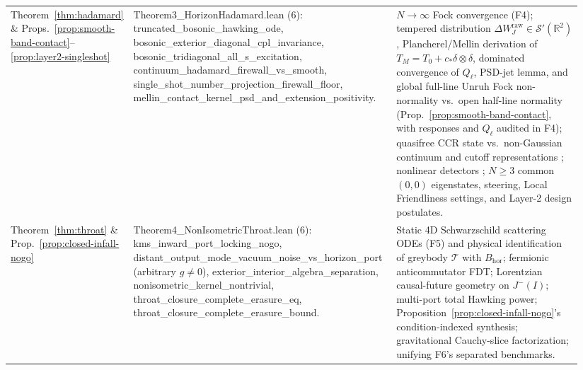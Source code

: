 \documentclass[11pt,a4paper]{article}
\theoremstyle{definition}
\theoremstyle{remark}
\newcommand{\cT}{\mathcal{T}}
\newcommand{\bbR}{\mathbb{R}}
\newcommand{\1}{\mathbf{1}}
\newcommand{\code}[1]{{\scriptsize\ttfamily #1}}
\begin{document}
\begin{table}[!tb]
\begin{tabular}{@{}>{\raggedright\arraybackslash}p{0.15\linewidth}>{\raggedright\arraybackslash}p{0.46\linewidth}>{\raggedright\arraybackslash}p{0.33\linewidth}@{}}
Theorem~\ref{thm:hadamard} \& Props.~\ref{prop:smooth-band-contact}--\ref{prop:layer2-singleshot} & \code{Theorem3\_\allowbreak HorizonHadamard.lean} (6): \code{truncated\_\allowbreak bosonic\_\allowbreak hawking\_\allowbreak ode}, \code{bosonic\_\allowbreak exterior\_\allowbreak diagonal\_\allowbreak cpl\_\allowbreak invariance}, \code{bosonic\_\allowbreak tridiagonal\_\allowbreak all\_\allowbreak s\_\allowbreak excitation}, \code{continuum\_\allowbreak hadamard\_\allowbreak firewall\_\allowbreak vs\_\allowbreak smooth}, \code{single\_\allowbreak shot\_\allowbreak number\_\allowbreak projection\_\allowbreak firewall\_\allowbreak floor}, \code{mellin\_\allowbreak contact\_\allowbreak kernel\_\allowbreak psd\_\allowbreak and\_\allowbreak extension\_\allowbreak positivity}. & $N\to\infty$ Fock convergence (F4); tempered distribution $\Delta W_J^{\mathrm{raw}}\in\mathcal{S}'(\bbR^2)$, Plancherel/Mellin derivation of $T_M=T_0+c_*\delta\otimes\delta$, dominated convergence of $Q_\ell$, PSD-jet lemma, and global full-line Unruh Fock non-normality vs.\ open half-line normality (Prop.~\ref{prop:smooth-band-contact}, with responses and $Q_\ell$ audited in F4); quasifree CCR state vs.\ non-Gaussian continuum and cutoff representations \cite{ArakiShiraishi1971}; nonlinear detectors \cite{Zambianco2026}; $N\ge 3$ common $(0,0)$ eigenstates, steering, Local Friendliness settings, and Layer-2 design postulates. \\
Theorem~\ref{thm:throat} \& Prop.~\ref{prop:closed-infall-nogo} & \code{Theorem4\_\allowbreak NonIsometricThroat.lean} (6): \code{kms\_\allowbreak inward\_\allowbreak port\_\allowbreak locking\_\allowbreak nogo}, \code{distant\_\allowbreak output\_\allowbreak mode\_\allowbreak vacuum\_\allowbreak noise\_\allowbreak vs\_\allowbreak horizon\_\allowbreak port} (arbitrary $g\neq 0$), \code{exterior\_\allowbreak interior\_\allowbreak algebra\_\allowbreak separation}, \code{nonisometric\_\allowbreak kernel\_\allowbreak nontrivial}, \code{throat\_\allowbreak closure\_\allowbreak complete\_\allowbreak erasure\_\allowbreak eq}, \code{throat\_\allowbreak closure\_\allowbreak complete\_\allowbreak erasure\_\allowbreak bound}. & Static 4D Schwarzschild scattering ODEs (F5) and physical identification of greybody $\cT$ with $B_{\mathrm{hor}}$; fermionic anticommutator FDT; Lorentzian causal-future geometry on $J^-(I)$; multi-port total Hawking power; Proposition~\ref{prop:closed-infall-nogo}'s condition-indexed synthesis; gravitational Cauchy-slice factorization; unifying F6's separated benchmarks. \\
\bottomrule
\end{tabular}
\end{table}
\end{document}
